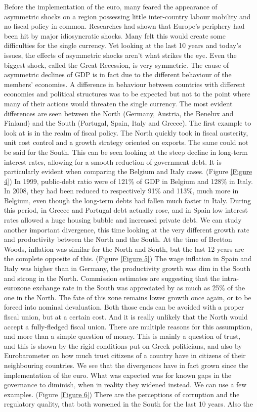 \documentclass[12pt]{article}
\begin{document}
Before the implementation of the euro, many feared the appearance of asymmetric shocks on a region possessing little inter-country labour mobility and no fiscal policy in common. Researches had shown that Europe's periphery had been hit by major idiosyncratic shocks. Many felt this would create some difficulties for the single currency. Yet looking at the last 10 years and today's issues, the effects of asymmetric shocks aren't what strikes the eye. Even the biggest shock, called the Great Recession, is very symmetric. The cause of asymmetric declines of GDP is in fact due to the different behaviour of the members' economies. A difference in behaviour between countries with different economies and political structures was to be expected but not to the point where many of their actions would threaten the single currency. The most evident differences are seen between the North (Germany, Austria, the Benelux and Finland) and the South (Portugal, Spain, Italy and Greece). The first example to look at is in the realm of fiscal policy. The North quickly took in fiscal austerity, unit cost control and a growth strategy oriented on exports. The same could not be said for the South. This can be seen looking at the steep decline in long-term interest rates, allowing for a smooth reduction of government debt. It is particularly evident when comparing the Belgium and Italy cases. (Figure \ref{Figure 4}) In 1999, public-debt ratio were of 121\% of GDP in Belgium and 128\% in Italy. In 2008, they had been reduced to respectively 91\% and 113\%, much more in Belgium, even though the long-term debts had fallen much faster in Italy. During this period, in Greece and Portugal debt actually rose, and in Spain low interest rates allowed a huge housing bubble and increased private debt. We can study another important divergence, this time looking at the very different growth rate and productivity between the North and the South. At the time of Bretton Woods, inflation was similar for the North and South, but the last 12 years are the complete opposite of this. (Figure \ref{Figure 5}) The wage inflation in Spain and Italy was higher than in Germany, the productivity growth was dim in the South and strong in the North. Commission estimates are suggesting that the intra-eurozone exchange rate in the South was appreciated by as much as 25\% of the one in the North. The fate of this zone remains lower growth once again, or to be forced into nominal devaluation. Both those ends can be avoided with a proper fiscal union, but at a certain cost. And it is really unlikely that the North would accept a fully-fledged fiscal union. There are multiple reasons for this assumption, and more than a simple question of money. This is mainly a question of trust, and this is shown by the rigid conditions put on Greek politicians, and also by Eurobarometer on how much trust citizens of a country have in citizens of their neighbouring countries. We see that the divergences have in fact grown since the implementation of the euro. What was expected was for known gaps in the governance to diminish, when in reality they widened instead. We can use a few examples. (Figure \ref{Figure 6}) There are the perceptions of corruption and the regulatory quality, that both worsened in the South for the last 10 years. Also the 
\end{document}
